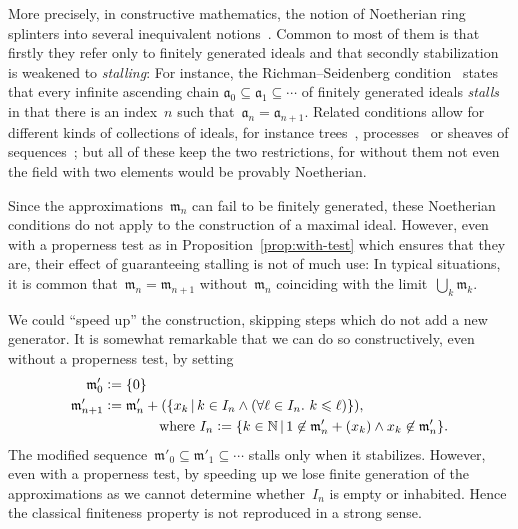 \documentclass[com,11pt,crcready]{iosart2x}
\theoremstyle{definition}
\theoremstyle{plain}
\theoremstyle{remark}
\newcommand{\?}{\,{:}\,}
\newcommand{\aaa}{\mathfrak{a}}
\newcommand{\mmm}{\mathfrak{m}}
\newcommand{\NN}{\mathbb{N}}
\newcommand{\defeq}{\vcentcolon=}
\renewcommand{\_}{\mathpunct{.}\,}
\begin{document}
More precisely, in constructive mathematics, the notion of Noetherian ring
splinters into several inequivalent notions~\cite{richman:noetherian,mines-richman-ruitenburg:constructive-algebra,perdry:noetherian,perdry:lazy,perdry-schuster:noetherian,schuster-zappe:noetherian,coquand-lombardi:krull,coquand:invariant,tennenbaum:hilbert,seidenberg:noether,jacobsson-lofwall:standard}. Common to most of them
is that firstly they refer only to finitely generated ideals and that secondly
stabilization is weakened to \emph{stalling}: For instance, the Richman--Seidenberg
condition~\cite[Section~III.2]{mines-richman-ruitenburg:constructive-algebra}
states that every infinite ascending chain
$\aaa_0 \subseteq \aaa_1 \subseteq \cdots$ of finitely generated ideals
\emph{stalls} in that there is an index~$n$ such that~$\aaa_n = \aaa_{n+1}$.
Related conditions allow for different kinds of collections of ideals, for
instance trees~\cite{richman:noetherian}, processes~\cite[Section~3.9]{blechschmidt:phd} or
sheaves of sequences~\cite{coquand-lombardi:krull,coquand:invariant,blechschmidt-oldenziel:multiverse};
but all of these keep the two restrictions, for without them not
even the field with two elements would be provably Noetherian.

Since the approximations~$\mmm_n$ can fail to be finitely generated, these
Noetherian conditions do not apply to the construction of a maximal ideal.
However, even with a properness test as in Proposition~\ref{prop:with-test}
which ensures that they are, their effect of guaranteeing stalling is not of
much use: In typical situations, it is common that~$\mmm_n = \mmm_{n+1}$
without~$\mmm_n$ coinciding with the limit~$\bigcup_k \mmm_k$.

We could ``speed up'' the construction, skipping steps which do not add a new
generator. It is somewhat remarkable that we can do so constructively, even
without a properness test, by setting
\begin{align*}
  \mmm'_0 &\defeq \{ 0 \} \\
  \mmm'_{n+1} &\defeq \mmm'_n + (\{ x_k \,|\,
    k \in I_n \wedge (\forall \ell \in I_n\_ k \leq \ell) \}), \\
  &\qquad\qquad\text{where $I_n \defeq \{ k \in \NN \,|\, 1 \not\in \mmm'_n +
  (x_k) \wedge x_k \not\in \mmm'_n \}$.}
\end{align*}
The modified sequence~$\mmm'_0 \subseteq \mmm'_1 \subseteq \cdots$ stalls only
when it stabilizes. However, even with a properness test, by speeding up we lose
finite generation of the approximations as we cannot determine whether~$I_n$ is
empty or inhabited. Hence the classical
finiteness property is not reproduced in a strong sense.
\end{document}
